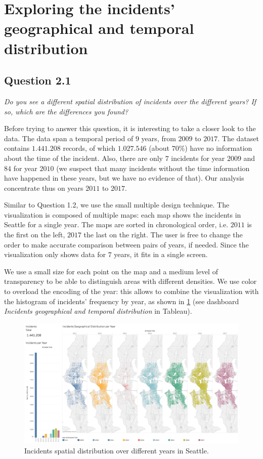 \section{Exploring the incidents' geographical and temporal distribution}

\subsection*{Question 2.1}
\textit{Do you see a different spatial distribution of incidents over the different years? If so, which are the differences you found?}

Before trying to answer this question, it is interesting to take a closer look to the data.
The data span a temporal period of $9$ years, from $2009$ to $2017$.
The dataset contains $1.441.208$ records, of which $1.027.546$ (about $70\%$) have no information about the time of the incident.
Also, there are only $7$ incidents for year $2009$ and $84$ for year $2010$ (we suspect that many incidents without the time information have happened in these years, but we have no evidence of that).
Our analysis concentrate thus on years $2011$ to $2017$.

Similar to Question 1.2, we use the small multiple design technique.
The visualization is composed of multiple maps: each map shows the incidents in Seattle for a single year.
The maps are sorted in chronological order, i.e. $2011$ is the first on the left, $2017$ the last on the right.
The user is free to change the order to make accurate comparison between pairs of years, if needed.
Since the visualization only shows data for $7$ years, it fits in a single screen.

We use a small size for each point on the map and a medium level of transparency to be able to distinguish areas with different densities.
We use color to overload the encoding of the year:
this allows to combine the visualization with the histogram of incidents' frequency by year, as shown in \cref{fig:2_1_geographical_temporal_distribution} (see dashboard \textit{Incidents geographical and temporal distribution} in Tableau).

\begin{figure}[H]
	\centering
	\includegraphics[width=\columnwidth]{figures/2_1_geographical_temporal_distribution}
	\caption{Incidents spatial distribution over different years in Seattle.}
	\label{fig:2_1_geographical_temporal_distribution}
\end{figure}

